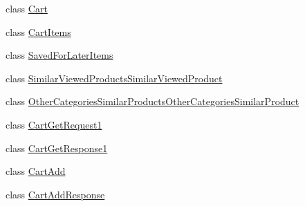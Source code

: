 \begin{DoxyCompactItemize}
class \hyperlink{class_amazon___price___finder_1_1amazon_1_1ecs_1_1_cart}{Cart}
\begin{DoxyCompactList}\small\item\em \end{DoxyCompactList}\item 
class \hyperlink{class_amazon___price___finder_1_1amazon_1_1ecs_1_1_cart_items}{Cart\-Items}
\begin{DoxyCompactList}\small\item\em \end{DoxyCompactList}\item 
class \hyperlink{class_amazon___price___finder_1_1amazon_1_1ecs_1_1_saved_for_later_items}{Saved\-For\-Later\-Items}
\begin{DoxyCompactList}\small\item\em \end{DoxyCompactList}\item 
class \hyperlink{class_amazon___price___finder_1_1amazon_1_1ecs_1_1_similar_viewed_products_similar_viewed_product}{Similar\-Viewed\-Products\-Similar\-Viewed\-Product}
\begin{DoxyCompactList}\small\item\em \end{DoxyCompactList}\item 
class \hyperlink{class_amazon___price___finder_1_1amazon_1_1ecs_1_1_other_categories_similar_products_other_categories_similar_product}{Other\-Categories\-Similar\-Products\-Other\-Categories\-Similar\-Product}
\begin{DoxyCompactList}\small\item\em \end{DoxyCompactList}\item 
class \hyperlink{class_amazon___price___finder_1_1amazon_1_1ecs_1_1_cart_get_request1}{Cart\-Get\-Request1}
\item 
class \hyperlink{class_amazon___price___finder_1_1amazon_1_1ecs_1_1_cart_get_response1}{Cart\-Get\-Response1}
\item 
class \hyperlink{class_amazon___price___finder_1_1amazon_1_1ecs_1_1_cart_add}{Cart\-Add}
\begin{DoxyCompactList}\small\item\em \end{DoxyCompactList}\item 
class \hyperlink{class_amazon___price___finder_1_1amazon_1_1ecs_1_1_cart_add_response}{Cart\-Add\-Response}
\begin{DoxyCompactList}\small\item\em \end{DoxyCompactList}\item 

\end{DoxyCompactItemize}
